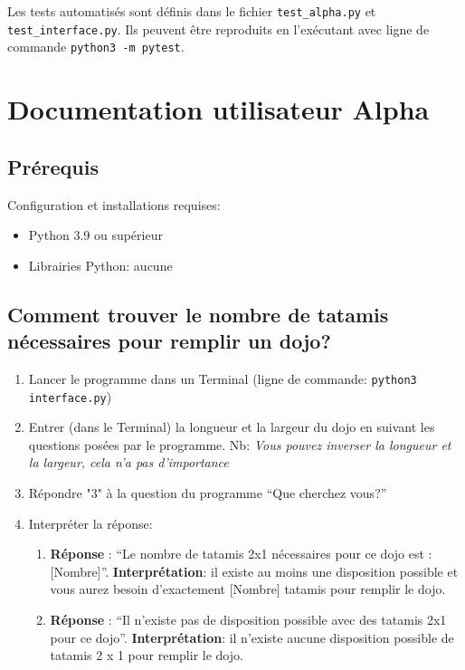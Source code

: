 


\bigskip

Les tests automatisés sont définis dans le fichier \texttt{test\_alpha.py} et \texttt{test\_interface.py}. Ils peuvent être reproduits
en l'exécutant avec ligne de commande \texttt{python3 -m pytest}.


\section{Documentation utilisateur Alpha}

\subsection{Prérequis}

Configuration et installations requises:

\begin{itemize}
    \item Python 3.9 ou supérieur
    \item Librairies Python: aucune
\end{itemize}

\subsection{Comment trouver le nombre de tatamis nécessaires pour remplir un dojo?}

\begin{enumerate}
    \item Lancer le programme dans un Terminal (ligne de commande: \texttt{python3 interface.py})
    \item Entrer (dans le Terminal) la longueur et la largeur du dojo en suivant les questions posées par
          le programme. Nb: \textit{Vous pouvez inverser la longueur et la largeur, cela n’a pas d’importance}
    \item Répondre "3" à la question du programme “Que cherchez vous?”
    \item Interpréter la réponse:
          \begin{enumerate}
              \item \textbf{Réponse} : “Le nombre de tatamis 2x1 nécessaires pour ce dojo est : [Nombre]”.
                    \textbf{Interprétation}: il existe au moins une disposition possible et vous aurez besoin
                    d’exactement [Nombre] tatamis pour remplir le dojo.
              \item \textbf{Réponse} : “Il n'existe pas de disposition possible avec des tatamis 2x1 pour ce dojo”.
                    \textbf{Interprétation}: il n’existe aucune disposition possible de tatamis 2 x 1 pour remplir le dojo.
          \end{enumerate}
\end{enumerate}



